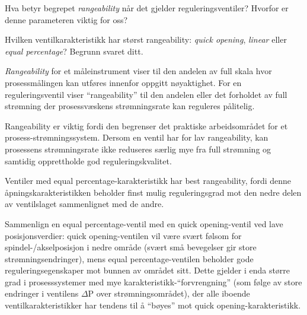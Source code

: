

Hva betyr begrepet {\it rangeability} når det gjelder reguleringsventiler? Hvorfor er denne parameteren viktig for oss?  

\vskip 10pt

Hvilken ventilkarakteristikk har størst rangeability: {\it quick opening}, {\it linear} eller {\it equal percentage}? Begrunn svaret ditt.







{\it Rangeability} for et måleinstrument viser til den andelen av full skala hvor prosessmålingen kan utføres innenfor oppgitt nøyaktighet. For en reguleringsventil viser ``rangeability'' til den andelen eller det forholdet av full strømning der prosessvæskens strømningsrate kan reguleres pålitelig.
 
Rangeability er viktig fordi den begrenser det praktiske arbeidsområdet for et prosess-strømningssystem. Dersom en ventil har for lav rangeability, kan prosessens strømningsrate ikke reduseres særlig mye fra full strømning og samtidig opprettholde god reguleringskvalitet.

\vskip 10pt

Ventiler med equal percentage-karakteristikk har best rangeability, fordi denne åpningskarakteristikken beholder finst mulig reguleringsgrad mot den nedre delen av ventilslaget sammenlignet med de andre.

Sammenlign en equal percentage-ventil med en quick opening-ventil ved lave posisjonsverdier: quick opening-ventilen vil være svært følsom for spindel-/akselposisjon i nedre område (svært små bevegelser gir store strømningsendringer), mens equal percentage-ventilen beholder gode reguleringsegenskaper mot bunnen av området sitt. Dette gjelder i enda større grad i prosesssystemer med mye karakteristikk-``forvrengning'' (som følge av store endringer i ventilens $\Delta$P over strømningsområdet), der alle iboende ventilkarakteristikker har tendens til å ``bøyes'' mot quick opening-karakteristikk.
 









